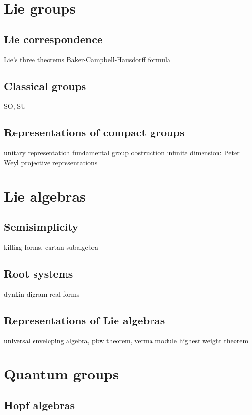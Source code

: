 \documentclass{../note}
\begin{document}
\part{Lie groups}
\chapter{Lie correspondence}
Lie's three theorems
Baker-Campbell-Hausdorff formula
\chapter{Classical groups}
SO, SU
\chapter{Representations of compact groups}
unitary representation
fundamental group obstruction
infinite dimension: Peter Weyl
projective representations




\part{Lie algebras}
\chapter{Semisimplicity}
killing forms, cartan subalgebra
\chapter{Root systems}
dynkin digram
real forms
\chapter{Representations of Lie algebras}
universal enveloping algebra, pbw theorem, verma module
highest weight theorem



\part{Quantum groups}
\chapter{Hopf algebras}
\chapter{}
\end{document}
